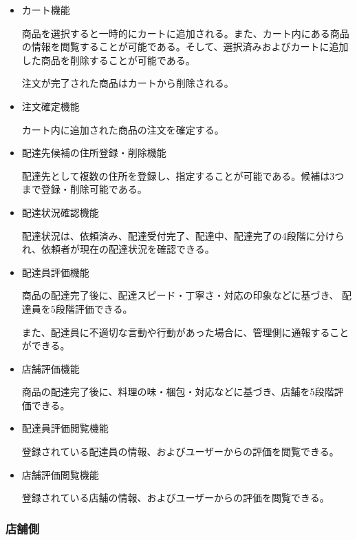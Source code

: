 \begin{itemize}
\begin{itemize}
        \item カート機能

        商品を選択すると一時的にカートに追加される。また、カート内にある商品の情報を閲覧することが可能である。そして、選択済みおよびカートに追加した商品を削除することが可能である。

        注文が完了された商品はカートから削除される。

        
        \item 注文確定機能
        
        カート内に追加された商品の注文を確定する。
        
        \item 配達先候補の住所登録・削除機能
        
        配達先として複数の住所を登録し、指定することが可能である。候補は3つまで登録・削除可能である。
        \item 配達状況確認機能
        
        配達状況は、依頼済み、配達受付完了、配達中、配達完了の4段階に分けられ、依頼者が現在の配達状況を確認できる。

        \item 配達員評価機能
        
        商品の配達完了後に、配達スピード・丁寧さ・対応の印象などに基づき、 配達員を5段階評価できる。

        また、配達員に不適切な言動や行動があった場合に、管理側に通報することができる。

        \item 店舗評価機能
        
        商品の配達完了後に、料理の味・梱包・対応などに基づき、店舗を5段階評価できる。
        
        \item 配達員評価閲覧機能 
        
        登録されている配達員の情報、およびユーザーからの評価を閲覧できる。

        \item 店舗評価閲覧機能 
        
        登録されている店舗の情報、およびユーザーからの評価を閲覧できる。 
    \end{itemize}
  
\end{itemize}



\subsubsection{店舗側}

